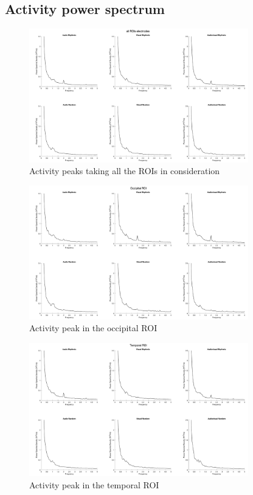 \subsection*{Activity power spectrum}
\begin{figure}[H]
    \centering
    \includegraphics[width=0.85\textwidth]{healthy_images/allROI_graph.png}
    \caption{Activity peaks taking all the ROIs in consideration}
    \label{fig: allROI}
\end{figure}
\begin{figure}[H]
    \centering
    \includegraphics[width=0.85\textwidth]{healthy_images/occipitalROI_graph.png}
    \caption{Activity peak in the occipital ROI}
    \label{fig: occipital ROI}
\end{figure}
\begin{figure}[H]
    \centering
    \includegraphics[width=0.85\textwidth]{healthy_images/temporalROI_graph.png}
    \caption{Activity peak in the temporal ROI}
    \label{fig: temporal ROI}
\end{figure}
